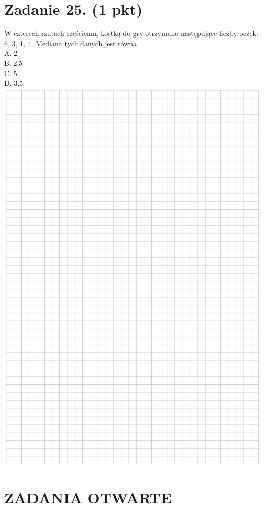 \documentclass[10pt]{article}
\begin{document}
\section*{Zadanie 25. (1 pkt)}
W czterech rzutach sześcienną kostką do gry otrzymano następujące liczby oczek: 6, 3, 1, 4. Mediana tych danych jest równa\\
A. 2\\
B. 2,5\\
C. 5\\
D. 3,5\\
\includegraphics[max width=\textwidth, center]{2024_11_21_603d5c1b2a7d8d68f45fg-11}

\section*{ZADANIA OTWARTE}
\end{document}
